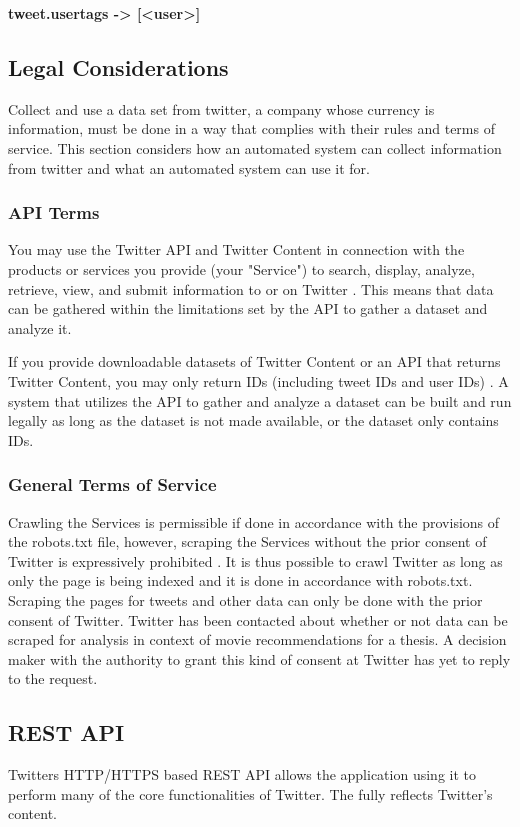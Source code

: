 \textbf{tweet.usertags -> [<user>]}

\subsection{Legal Considerations}\label{sec:pre-twitter-legal}
Collect and use a data set from twitter, a company whose currency is information, must be done in a way that complies with their rules and terms of service. This section considers how an automated system can collect information from twitter and what an automated system can use it for.

\subsubsection{API Terms}
You may use the Twitter API and Twitter Content in connection with the products or services you provide (your "Service") to search, display, analyze, retrieve, view, and submit information to or on Twitter \cite{twitter-api-terms}. This means that data can be gathered within the limitations set by the API to gather a dataset and analyze it.

If you provide downloadable datasets of Twitter Content or an API that returns Twitter Content, you may only return IDs (including tweet IDs and user IDs) \cite{twitter-api-terms}. A system that utilizes the API to gather and analyze a dataset can be built and run legally as long as the dataset is not made available, or the dataset only contains IDs.

\subsubsection{General Terms of Service}
Crawling the Services is permissible if done in accordance with the provisions of the robots.txt \cite{twitter-robots-txt} file, however, scraping the Services without the prior consent of Twitter is expressively prohibited \cite{twitter-tos}. It is thus possible to crawl Twitter as long as only the page is being indexed and it is done in accordance with robots.txt. Scraping the pages for tweets and other data can only be done with the prior consent of Twitter. Twitter has been contacted about whether or not data can be scraped for analysis in context of movie recommendations for a thesis. A decision maker with the authority to grant this kind of consent at Twitter has yet to reply to the request.


\subsection{REST API}\label{sec:pre-twitter-rest}
Twitters HTTP/HTTPS based REST API allows the application using it to perform many of the core functionalities of Twitter. The fully reflects Twitter's content.

